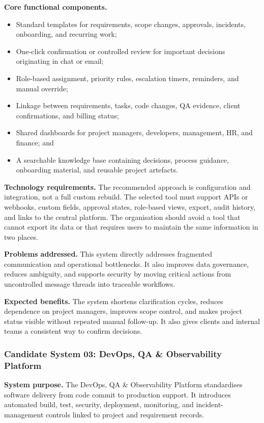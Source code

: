 \documentclass[12pt,a4paper]{report}
\begin{document}
\textbf{Core functional components.}
\begin{itemize}[leftmargin=1.6em]
    \item Standard templates for requirements, scope changes, approvals, incidents, onboarding,
          and recurring work;
    \item One-click confirmation or controlled review for important decisions originating in
          chat or email;
    \item Role-based assignment, priority rules, escalation timers, reminders, and manual override;
    \item Linkage between requirements, tasks, code changes, QA evidence, client confirmations,
          and billing status;
    \item Shared dashboards for project managers, developers, management, HR, and finance; and
    \item A searchable knowledge base containing decisions, process guidance, onboarding material,
          and reusable project artefacts.
\end{itemize}

\textbf{Technology requirements.}
The recommended approach is configuration and integration, not a full custom rebuild. The
selected tool must support APIs or webhooks, custom fields, approval states, role-based views,
export, audit history, and links to the central platform. The organisation should avoid a tool that
cannot export its data or that requires users to maintain the same information in two places.

\textbf{Problems addressed.}
This system directly addresses fragmented communication and operational bottlenecks. It also
improves data governance, reduces ambiguity, and supports security by moving critical actions
from uncontrolled message threads into traceable workflows.

\textbf{Expected benefits.}
The system shortens clarification cycles, reduces dependence on project managers, improves
scope control, and makes project status visible without repeated manual follow-up. It also gives
clients and internal teams a consistent way to confirm decisions.

\subsubsection{Candidate System 03: DevOps, QA \& Observability Platform}\label{sec:candidate-devops}

\textbf{System purpose.}
The DevOps, QA \& Observability Platform standardises software delivery from code commit to
production support. It introduces automated build, test, security, deployment, monitoring, and
incident-management controls linked to project and requirement records.
\end{document}
